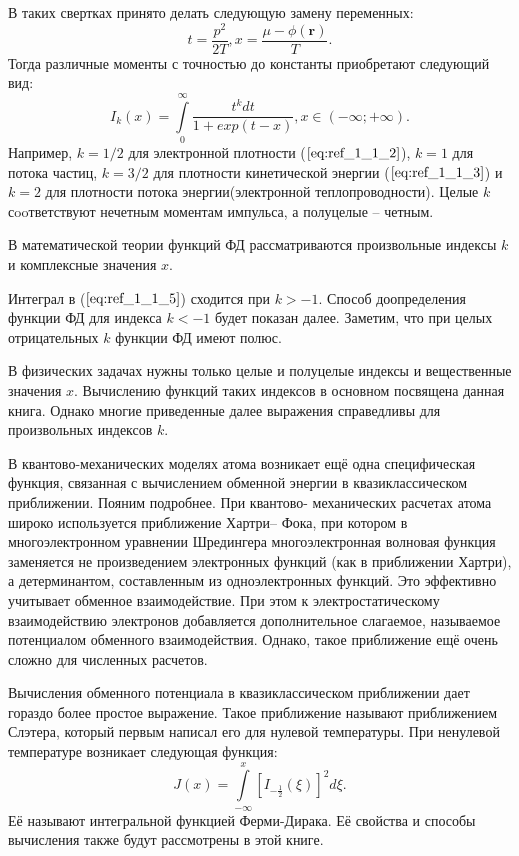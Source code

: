 В таких свертках принято делать следующую замену переменных:
\begin{equation}
t = \frac{p^2}{2T}, x = \frac{\mu - \phi(\textbf{r})}{T}.
\label{eq:ref_1_1_4}
\end{equation}
Тогда различные моменты с точностью до константы приобретают следующий вид:
\begin{equation}
I_k(x)=\int\limits_0^{\infty} \frac{t^kdt}{1+exp(t-x)}, x \in (-\infty ;+\infty).
\label{eq:ref_1_1_5}
\end{equation}
Например, $k = 1/2$ для электронной плотности ($\ref{eq:ref_1_1_2}$), $k = 1$ для потока частиц, $k = 3/2$ для плотности кинетической энергии ($\ref{eq:ref_1_1_3}$) и $k = 2$ для плотности потока энергии(электронной теплопроводности). Целые $k$ сooтветствуют нечетным моментам импульса, а полуцелые – четным.

В математической теории функций ФД рассматриваются произвольные индексы $k$ и комплексные значения $x$.

Интеграл в ($\ref{eq:ref_1_1_5}$) сходится при $k > -1$. Способ доопределения функции ФД для индекса $k < -1$ будет показан далее. Заметим, что при целых отрицательных $k$ функции ФД имеют полюс.

В физических задачах нужны только целые и полуцелые индексы и вещественные значения $x$. Вычислению функций таких индексов в основном посвящена данная книга. Однако многие приведенные далее выражения справедливы для произвольных индексов $k$.

В квантово-механических моделях атома возникает ещё одна
специфическая функция, связанная с вычислением обменной энергии в
квазиклассическом приближении. Пояним подробнее. При квантово-
механических расчетах атома широко используется приближение Хартри–
Фока, при котором в многоэлектронном уравнении Шредингера многоэлектронная волновая функция заменяется не произведением электронных функций (как в приближении Хартри), а детерминантом,
составленным из одноэлектронных функций. Это эффективно учитывает
обменное взаимодействие. При этом к электростатическому взаимодействию
электронов добавляется дополнительное слагаемое, называемое потенциалом
обменного взаимодействия. Однако, такое приближение ещё очень сложно для
численных расчетов.

Вычисления обменного потенциала в квазиклассическом приближении
дает гораздо более простое выражение. Такое приближение называют
приближением Слэтера, который первым написал его для нулевой
температуры. При ненулевой температуре возникает следующая функция:
\begin{equation}
J(x)=\int\limits_{-\infty}^x [I_{-\frac{1}{2}}(\xi)]^2d\xi.
\label{eq:ref_1_1_6}
\end{equation}
Её называют интегральной функцией Ферми-Дирака. Её свойства и способы вычисления также будут рассмотрены в этой книге. 
\\
